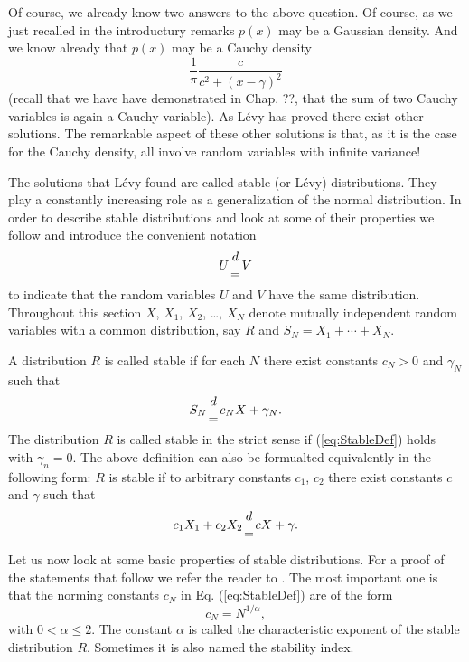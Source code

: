 Of course, we already know two answers to the above question. Of course, 
as we just recalled in the introductury remarks 
$p(x)$ may be  a
Gaussian density. And we know already that $p(x)$ may be a Cauchy density
\begin{displaymath}
\frac{1}{\pi} \frac{c}{c^2 + (x-\gamma)^2}
\end{displaymath}
(recall that we have have demonstrated in Chap. ??, 
that the sum of two Cauchy variables
is again a Cauchy variable). 
As L\'evy has proved there exist other solutions.
The remarkable aspect of these other solutions is that, as it is the case for
the Cauchy density, all involve random
variables with infinite variance!

The solutions that L\'evy found are called stable (or L\'evy) distributions.
They play a constantly increasing role as a generalization of the normal
distribution. In order to describe stable distributions and look at some of
their properties we follow \cite{Feller2} and introduce the convenient
notation 
\begin{displaymath}
  U {d \atop =} V
\end{displaymath}
to indicate that the random variables $U$ and $V$ have the same distribution.
Throughout this section $X$, $X_1$, $X_2$, \ldots , $X_N$ denote mutually
independent random variables with a common distribution, say $R$ and 
$S_N = X_1 + \cdots + X_N$.

A distribution $R$ is called stable if for each $N$ there exist constants
$c_N >0$ and $\gamma_N$ such that
\begin{equation}
\label{eq:StableDef}
  S_N {d \atop =} c_N  X + \gamma_N.
\end{equation}
The distribution $R$ is called stable in the strict sense if 
(\ref{eq:StableDef}) holds with $\gamma_n =0$. 
The above definition can also be formualted equivalently in the following
form: $R$ is stable if to arbitrary constants $c_1$,  $c_2$  there exist
constants $c$ and $\gamma$ such that
\begin{displaymath}
  c_1 X_1 + c_2 X_2 {d \atop =} c X + \gamma.
\end{displaymath}

Let us now look at some basic properties of stable distributions. 
For a proof of the statements that follow we refer the reader to 
\cite{Feller2}.
The most
important one is that the norming constants $c_N$ in Eq. (\ref{eq:StableDef})
are of the form
\begin{displaymath}
  c_N = N^{1/\alpha},
\end{displaymath}
with  $0< \alpha \le 2$. The constant $\alpha$ is called the
characteristic exponent of the stable distribution  $R$. Sometimes it is also
named the stability index.

